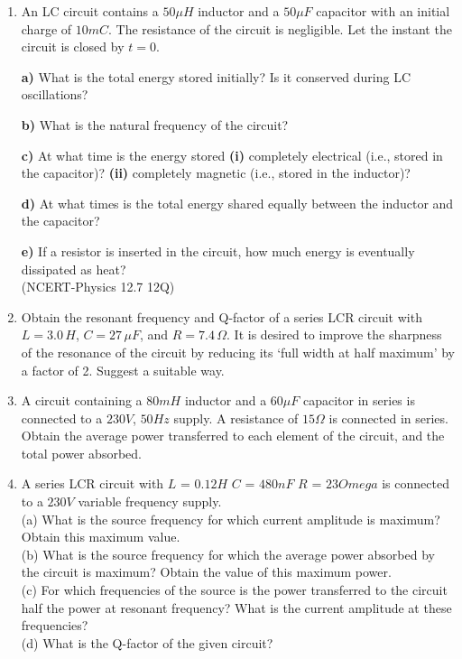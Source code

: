 \begin{enumerate}[label=\thesection.\arabic*,ref=\thesection.\theenumi]
\item An LC circuit contains a $50 \mu H$ inductor and a $50 \mu F$ capacitor with an initial charge of $10 mC$. The resistance of the circuit is negligible. Let the instant the circuit is closed by $t = 0$.

\textbf{a)} What is the total energy stored initially? Is it conserved during LC oscillations?

\textbf{b)} What is the natural frequency of the circuit?

\textbf{c)} At what time is the energy stored \textbf{(i)} completely electrical (i.e., stored in the capacitor)? \textbf{(ii)} completely magnetic (i.e., stored in the inductor)?

\textbf{d)} At what times is the total energy shared equally between the inductor and the capacitor?

\textbf{e)} If a resistor is inserted in the circuit, how much energy is eventually dissipated as heat? \\
\hfill(NCERT-Physics 12.7 12Q)\\
\solution 
\pagebreak 

\item Obtain the resonant frequency and Q-factor of a series LCR circuit with $L = 3.0\, H$, $C = 27\, \mu F$, and $R = 7.4\, \Omega$. It is desired to improve the sharpness of the resonance of the circuit by reducing its `full width at half maximum' by a factor of 2. Suggest a suitable way.\\
\solution


\pagebreak
\item A circuit containing a $80 mH$ inductor and a $60 \mu F$ capacitor in series is connected to a $230 V$, $50 Hz$ supply. A resistance of $15 \Omega $ is connected in series. Obtain the average power transferred to each element of the circuit, and the total power absorbed.\\
\solution
\pagebreak

\item A series LCR circuit with 
$L$ = $0.12 H$
$C$ = $480 nF$
$R$ = $23 Omega$
is connected to a $230 V$ variable frequency supply.\\
(a) What is the source frequency for which current amplitude is maximum? Obtain this maximum value.\\
(b) What is the source frequency for which the average power absorbed by the circuit is maximum? Obtain the value of this maximum power.\\
(c) For which frequencies of the source is the power transferred to the circuit half the power at resonant frequency? What is the current amplitude at these frequencies?\\
(d) What is the Q-factor of the given circuit?\\
\solution
\pagebreak
\end{enumerate}
